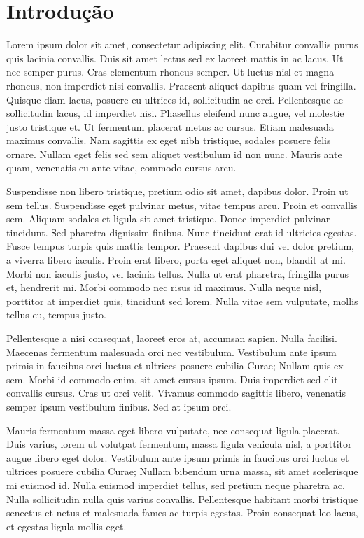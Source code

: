 \chapter{Introdução}
\label{ch:introducao}

Lorem ipsum dolor sit amet, consectetur adipiscing elit. Curabitur convallis purus quis lacinia convallis. Duis sit amet lectus sed ex laoreet mattis in ac lacus. Ut nec semper purus. Cras elementum rhoncus semper. Ut luctus nisl et magna rhoncus, non imperdiet nisi convallis. Praesent aliquet dapibus quam vel fringilla. Quisque diam lacus, posuere eu ultrices id, sollicitudin ac orci. Pellentesque ac sollicitudin lacus, id imperdiet nisi. Phasellus eleifend nunc augue, vel molestie justo tristique et. Ut fermentum placerat metus ac cursus. Etiam malesuada maximus convallis. Nam sagittis ex eget nibh tristique, sodales posuere felis ornare. Nullam eget felis sed sem aliquet vestibulum id non nunc. Mauris ante quam, venenatis eu ante vitae, commodo cursus arcu.

Suspendisse non libero tristique, pretium odio sit amet, dapibus dolor. Proin ut sem tellus. Suspendisse eget pulvinar metus, vitae tempus arcu. Proin et convallis sem. Aliquam sodales et ligula sit amet tristique. Donec imperdiet pulvinar tincidunt. Sed pharetra dignissim finibus. Nunc tincidunt erat id ultricies egestas. Fusce tempus turpis quis mattis tempor. Praesent dapibus dui vel dolor pretium, a viverra libero iaculis. Proin erat libero, porta eget aliquet non, blandit at mi. Morbi non iaculis justo, vel lacinia tellus. Nulla ut erat pharetra, fringilla purus et, hendrerit mi. Morbi commodo nec risus id maximus. Nulla neque nisl, porttitor at imperdiet quis, tincidunt sed lorem. Nulla vitae sem vulputate, mollis tellus eu, tempus justo.

Pellentesque a nisi consequat, laoreet eros at, accumsan sapien. Nulla facilisi. Maecenas fermentum malesuada orci nec vestibulum. Vestibulum ante ipsum primis in faucibus orci luctus et ultrices posuere cubilia Curae; Nullam quis ex sem. Morbi id commodo enim, sit amet cursus ipsum. Duis imperdiet sed elit convallis cursus. Cras ut orci velit. Vivamus commodo sagittis libero, venenatis semper ipsum vestibulum finibus. Sed at ipsum orci.

Mauris fermentum massa eget libero vulputate, nec consequat ligula placerat. Duis varius, lorem ut volutpat fermentum, massa ligula vehicula nisl, a porttitor augue libero eget dolor. Vestibulum ante ipsum primis in faucibus orci luctus et ultrices posuere cubilia Curae; Nullam bibendum urna massa, sit amet scelerisque mi euismod id. Nulla euismod imperdiet tellus, sed pretium neque pharetra ac. Nulla sollicitudin nulla quis varius convallis. Pellentesque habitant morbi tristique senectus et netus et malesuada fames ac turpis egestas. Proin consequat leo lacus, et egestas ligula mollis eget.

